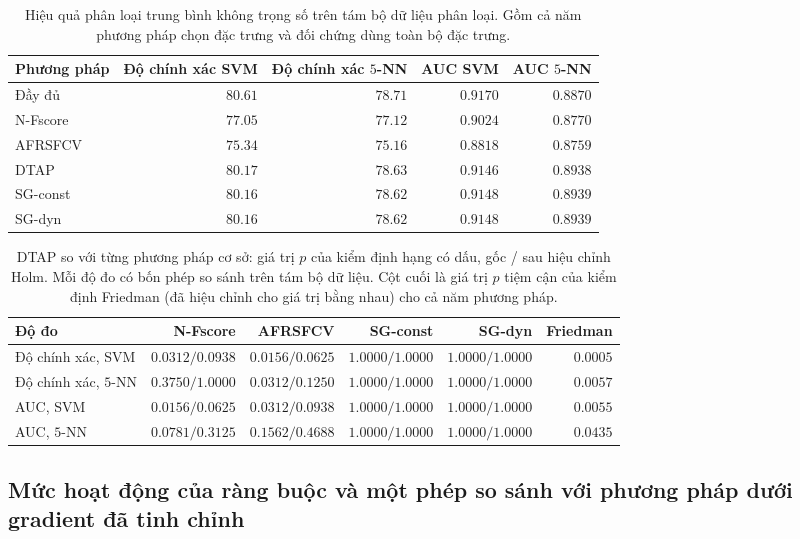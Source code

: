 \documentclass[]{interact}
\theoremstyle{plain}
\theoremstyle{definition}
\theoremstyle{remark}
\begin{document}
\begin{table}[htbp]
\centering\small\setlength{\tabcolsep}{4pt}
\caption{Hiệu quả phân loại trung bình không trọng số trên tám bộ dữ liệu phân loại. Gồm cả năm phương pháp chọn đặc trưng và đối chứng dùng toàn bộ đặc trưng.}\label{tab:perf-summary}
\begin{tabular}{lrrrr}
\toprule
Phương pháp & Độ chính xác SVM & Độ chính xác $5$-NN & AUC SVM & AUC $5$-NN \\
\midrule
Đầy đủ & $80.61$ & $78.71$ & $0.9170$ & $0.8870$ \\
N-Fscore & $77.05$ & $77.12$ & $0.9024$ & $0.8770$ \\
AFRSFCV & $75.34$ & $75.16$ & $0.8818$ & $0.8759$ \\
DTAP & $80.17$ & $78.63$ & $0.9146$ & $0.8938$ \\
SG-const & $80.16$ & $78.62$ & $0.9148$ & $0.8939$ \\
SG-dyn & $80.16$ & $78.62$ & $0.9148$ & $0.8939$ \\
\bottomrule
\end{tabular}

\end{table}
\begin{table}[htbp]
\centering\footnotesize\setlength{\tabcolsep}{4pt}
\caption{DTAP so với từng phương pháp cơ sở: giá trị $p$ của kiểm định hạng có dấu, gốc / sau hiệu chỉnh Holm. Mỗi độ đo có bốn phép so sánh trên tám bộ dữ liệu. Cột cuối là giá trị $p$ tiệm cận của kiểm định Friedman (đã hiệu chỉnh cho giá trị bằng nhau) cho cả năm phương pháp.}\label{tab:wilcoxon}
\begin{tabular}{lrrrrr}
\toprule
Độ đo & N-Fscore & AFRSFCV & SG-const & SG-dyn & Friedman \\
\midrule
Độ chính xác, SVM & $0.0312/0.0938$ & $0.0156/0.0625$ & $1.0000/1.0000$ & $1.0000/1.0000$ & $0.0005$ \\
Độ chính xác, $5$-NN & $0.3750/1.0000$ & $0.0312/0.1250$ & $1.0000/1.0000$ & $1.0000/1.0000$ & $0.0057$ \\
AUC, SVM & $0.0156/0.0625$ & $0.0312/0.0938$ & $1.0000/1.0000$ & $1.0000/1.0000$ & $0.0055$ \\
AUC, $5$-NN & $0.0781/0.3125$ & $0.1562/0.4688$ & $1.0000/1.0000$ & $1.0000/1.0000$ & $0.0435$ \\
\bottomrule
\end{tabular}

\end{table}

\subsection{Mức hoạt động của ràng buộc và một phép so sánh với phương pháp dưới gradient đã tinh chỉnh}
\label{ssec:feasibility-audit}
\end{document}
